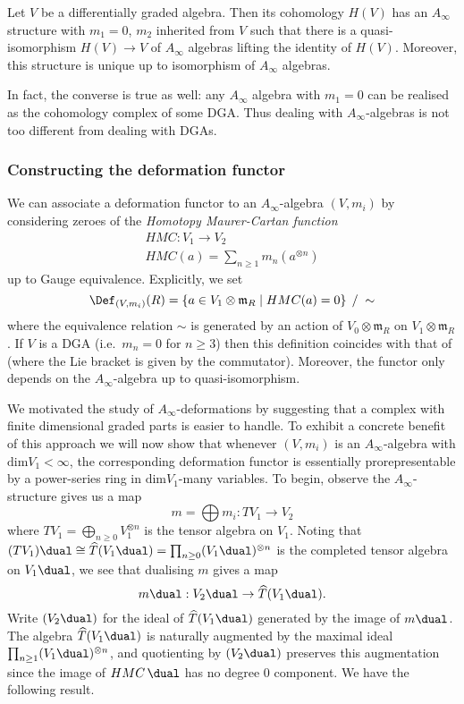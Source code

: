 \begin{theorem}[Kadeishvili] 
    Let \(V\) be a differentially graded algebra. Then its cohomology \(H(V)\) has
    an \(A_\infty\) structure with \(m_1=0\), \(m_2\) inherited from \(V\) such
    that there is a quasi-isomorphism \(H(V)\rightarrow V\) of \(A_\infty\)
    algebras lifting the identity of \(H(V)\). Moreover, this structure is
    unique up to isomorphism of \(A_\infty\) algebras. 
\end{theorem}

In fact, the converse is true as well: any \(A_\infty\) algebra with \(m_1=0\)
can be realised as the cohomology complex of some DGA. Thus dealing with
\(A_\infty\)-algebras is not too different from dealing with DGAs. 

\subsubsection{Constructing the deformation functor}
We can associate a deformation functor to an \(A_\infty\)-algebra \((V,m_i)\) by
considering zeroes of the \textit{Homotopy Maurer-Cartan function}
\begin{gather*}
    HMC: V_1\rightarrow V_2 \\
    HMC(a)=\sum_{n\geq 1} m_n(a^{\otimes n})
\end{gather*}
up to Gauge equivalence. Explicitly, we set 
\[\Def_{(V,m_i)}(R)=\left\{a\in V_1\otimes \mathfrak{m}_R\;|\; HMC(a) =
0\right\}\;/\;\sim\]
where the equivalence relation \(\sim\) is generated by an action of
\(V_0\otimes \mathfrak{m}_R\) on \(V_1\otimes \mathfrak{m}_R\). If \(V\) is a
DGA (i.e.\ \(m_n=0\) for \(n\geq 3\)) then this definition coincides with that
of  (where the Lie bracket is given by the commutator).
Moreover, the functor only depends on the \(A_\infty\)-algebra up to
quasi-isomorphism.

We motivated the study of \(A_\infty\)-deformations by suggesting that a complex
with finite dimensional graded parts is easier to handle. To exhibit a concrete
benefit of this approach we will now show that whenever \((V,m_i)\) is an
\(A_\infty\)-algebra with \(\text{dim}V_1<\infty\), the corresponding
deformation functor is essentially prorepresentable by a power-series ring in
\(\text{dim}V_1\)-many variables. To begin, observe the \(A_\infty\)-structure gives us a map 
\[ m =  \bigoplus m_i : TV_1 \rightarrow V_2 \]
where \(TV_1 = \bigoplus_{n\geq 0} V_1^{\otimes n}\) is the tensor algebra on
\(V_1\).  Noting that \((TV_1)\dual \cong \widehat{T}(V_1\dual) =
\prod_{n\geq 0} (V_1\dual)^{\otimes n}\) is the completed tensor algebra on
\(V_1\dual\), we see that dualising \(m\) gives a map
\[m\dual : V_2\dual \rightarrow \widehat{T}(V_1\dual).\]
Write \((V_2\dual)\) for the ideal of \(\widehat{T}(V_1\dual)\) generated by the
image of \(m\dual\). The algebra \(\widehat{T}(V_1\dual)\) is naturally
augmented by the maximal ideal \(\prod_{n\geq 1}(V_1\dual)^{\otimes n}\), and
quotienting by \((V_2\dual)\) preserves this augmentation since the image of
\(HMC\,\dual\) has no degree \(0\) component. We have the following result.

